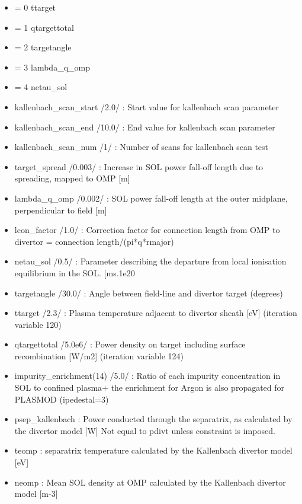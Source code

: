\documentclass[]{article}
\providecommand{\tightlist}{%
  \setlength{\itemsep}{0pt}\setlength{\parskip}{0pt}}
\begin{document}
\begin{itemize}
  \begin{itemize}
  \tightlist
  \item
    = 0 ttarget
  \item
    = 1 qtargettotal
  \item
    = 2 targetangle
  \item
    = 3 lambda\_q\_omp
  \item
    = 4 netau\_sol
  \item
    kallenbach\_scan\_start /2.0/ : Start value for kallenbach scan
    parameter
  \item
    kallenbach\_scan\_end /10.0/ : End value for kallenbach scan
    parameter
  \item
    kallenbach\_scan\_num /1/ : Number of scans for kallenbach scan test
  \item
    target\_spread /0.003/ : Increase in SOL power fall-off length due
    to spreading, mapped to OMP {[}m{]}
  \item
    lambda\_q\_omp /0.002/ : SOL power fall-off length at the outer
    midplane, perpendicular to field {[}m{]}
  \item
    lcon\_factor /1.0/ : Correction factor for connection length from
    OMP to divertor = connection length/(pi*q*rmajor)
  \item
    netau\_sol /0.5/ : Parameter describing the departure from local
    ionisation equilibrium in the SOL. {[}ms.1e20
  \item
    targetangle /30.0/ : Angle between field-line and divertor target
    (degrees)
  \item
    ttarget /2.3/ : Plasma temperature adjacent to divertor sheath
    {[}eV{]} (iteration variable 120)
  \item
    qtargettotal /5.0e6/ : Power density on target including surface
    recombination {[}W/m2{]} (iteration variable 124)
  \item
    impurity\_enrichment(14) /5.0/ : Ratio of each impurity
    concentration in SOL to confined plasma+ the enrichment for Argon is
    also propagated for PLASMOD (ipedestal=3)
  \item
    psep\_kallenbach : Power conducted through the separatrix, as
    calculated by the divertor model {[}W{]} Not equal to pdivt unless
    constraint is imposed.
  \item
    teomp : separatrix temperature calculated by the Kallenbach divertor
    model {[}eV{]}
  \item
    neomp : Mean SOL density at OMP calculated by the Kallenbach
    divertor model {[}m-3{]}

\end{itemize}
\end{itemize}
\end{document}
